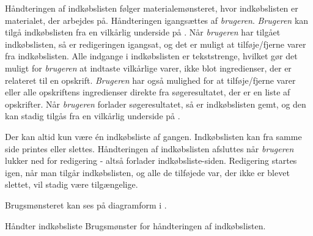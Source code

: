 {Håndteringen af indkøbslisten følger materialemønsteret\cite[p.~128]{ooad}, hvor indkøbslisten er materialet, der arbejdes på. Håndteringen igangsættes af \textit{brugeren}. \textit{Brugeren} kan tilgå indkøbslisten fra en vilkårlig underside på \Foodl. Når \textit{brugeren} har tilgået indkøbslisten, så er redigeringen igangsat, og det er muligt at tilføje/fjerne varer fra indkøbslisten. Alle indgange i indkøbslisten er tekststrenge, hvilket gør det muligt for \textit{brugeren} at indtaste vilkårlige varer, ikke blot ingredienser, der er relateret til \fx en opskrift. \textit{Brugeren} har også mulighed for at tilføje/fjerne varer eller alle opskriftens ingredienser direkte fra søgeresultatet, der er en liste af opskrifter. Når \textit{brugeren} forlader søgeresultatet, så er indkøbslisten gemt, og den kan stadig tilgås fra en vilkårlig underside på \Foodl. 

Der kan altid kun være én indkøbsliste af gangen. Indkøbslisten kan fra samme side printes eller slettes. Håndteringen af indkøbslisten afsluttes når \textit{brugeren} lukker ned for redigering - altså forlader indkøbsliste-siden. Redigering startes igen, når man tilgår indkøbslisten, og alle de tilføjede var, der ikke er blevet slettet, vil stadig være tilgængelige.

Brugsmønsteret kan ses på diagramform i .}
{}
{Håndter indkøbsliste}
{Brugsmønster for håndteringen af indkøbslisten.}